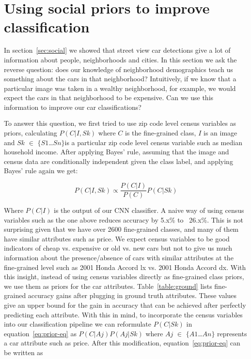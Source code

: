 \documentclass[10pt,twocolumn,letterpaper]{article}
\begin{document}
\section{Using social priors to improve classification}
\label{sec:prior}
In section~\ref{sec:social} we showed that street view car detections give a lot of information about people, neighborhoods and cities. In this section we ask the reverse question: does our knowledge of neighborhood demographics teach us something about the cars in that neighborhood? Intuitively, if we know that a particular image was taken in a wealthy neighborhood, for example, we would expect the cars in that neighborhood to be expensive. Can we use this information to improve our car classifications?

To answer this question, we first tried to use zip code level census variables as priors, calculating \(P(C|I,Sk)\) where \(C\) is the fine-grained class, \(I\) is an image and \(Sk\) \(\in\) \(\{\)\(S1\)\ldots \(Sn\)\(\}\)is a particular zip code level census variable such as median household income. After applying Bayes' rule, assuming that the image and census data are conditionally independent given the class label, and applying Bayes' rule again we get:

\begin{equation}
P(C|I,Sk)\propto \frac{P(C|I)}{P(C)}P(C|Sk)
\label{eq:prior-eq}
\end{equation}

Where \(P(C|I)\) is the output of our CNN classifier. A naive way of using census variables such as the one above reduces accuracy by 5.x\% to ~26.x\%. This is not surprising given that we have over 2600 fine-grained classes, and many of them have similar attributes such as price. We expect census variables to be good indicators of cheap vs. expensive or old vs. new cars but not to give us much information about the presence/absence of cars with similar attributes at the fine-grained level such as 2001 Honda Accord lx vs. 2001 Honda Accord dx. With this insight, instead of using census variables directly as fine-grained class priors, we use them as priors for the car attributes. Table~\ref{table:ground} lists fine-grained accuracy gains after plugging in ground truth attributes. These values give an upper bound for the gain in accuracy that can be achieved after perfectly predicting each attribute. With this in mind, to incorporate the census variables into our classification pipeline we can reformulate \(P(C|Sk)\) in equation~\ref{eq:prior-eq} as \(P(C|Aj)\)\(P(Aj|Sk)\) where \(Aj\) \(\in\) \(\{\)\(A1\)\ldots\(An\)\(\}\) represents a car attribute such as price. After this modification, equation~\ref{eq:prior-eq} can be written as  
\end{document}
